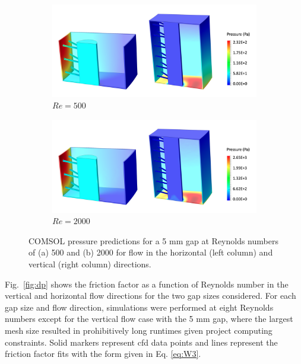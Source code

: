 \begin{figure}[!htb]
\centering
\begin{subfigure}{\textwidth}
  \centering
  \includegraphics[width=0.8\linewidth]{figs/Re500_cm1_p.png}
  \caption{\(Re=500\)}
\end{subfigure}
\begin{subfigure}{\textwidth}
  \centering
  \includegraphics[width=0.8\linewidth]{figs/Re2000_cm1_p.png}
  \caption{\(Re=2000\)}
\end{subfigure}
\caption{COMSOL pressure predictions for a 5 \si{\milli\meter} gap at Reynolds numbers of (a) 500 and (b) 2000 for flow in the horizontal (left column) and vertical (right column) directions.}
\label{fig:pressure_10}
\end{figure}

Fig.\ \ref{fig:dp} shows the friction factor as a function of Reynolds number in the vertical and horizontal flow directions for the two gap sizes considered. For each gap size and flow direction, simulations were performed at eight Reynolds numbers except for the vertical flow case with the 5 \si{\milli\meter} gap, where the largest mesh size resulted in prohibitively long runtimes given project computing constraints. Solid markers represent \gls{cfd} data points and lines represent the friction factor fits with the form given in Eq. \eqref{eq:W3}. 

